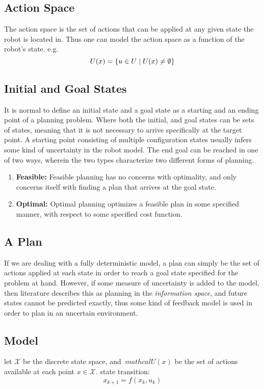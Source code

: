 \subsection{Action Space}
The action space is the set of actions that can be applied at any given state
the robot is located in. Thus one can model the action space as a function of
the robot's state. e.g.
\[
  U(x) = \lbrace u \in U \mid U(x) \neq \emptyset \rbrace
\]

\subsection{Initial and Goal States}
It is normal to define an initial state and a goal state as a starting and an
ending point of a planning problem. Where both the initial, and goal states can
be sets of states, meaning that it is not necessary to arrive specifically at
the target point. A starting point consisting of multiple configuration states
usually infers some kind of uncertainty in the robot model. The end goal can be
reached in one of two ways, wherein the two types characterize two different
forms of planning.
\begin{enumerate}
\item\textbf{Feasible:} Feasible planning has no concerns with optimality, and
  only concerns itself with finding a plan that arrives at the goal state.
\item\textbf{Optimal:} Optimal planning optimizes a feasible plan in some
  specified manner, with respect to some specified cost function.
\end{enumerate}

\subsection{A Plan}
If we are dealing with a fully deterministic model, a plan can simply be the set
of actions applied at each state in order to reach a goal state specified for
the problem at hand. However, if some measure of uncertainty is added to the
model, then literature describes this as planning in the \textit{information
  space}, and future states cannot be predicted exactly, thus some kind of
feedback model is used in order to plan in an uncertain environment.

\subsection{Model}
let \(\mathcal{X}\) be the discrete state space, and \(\ mathcal{U}(x)\) be
the set of actions available at each point \(x \in \mathcal{X}\).
state transition:
\[
  x_{k+1} = f(x_k, u_k)
\]

